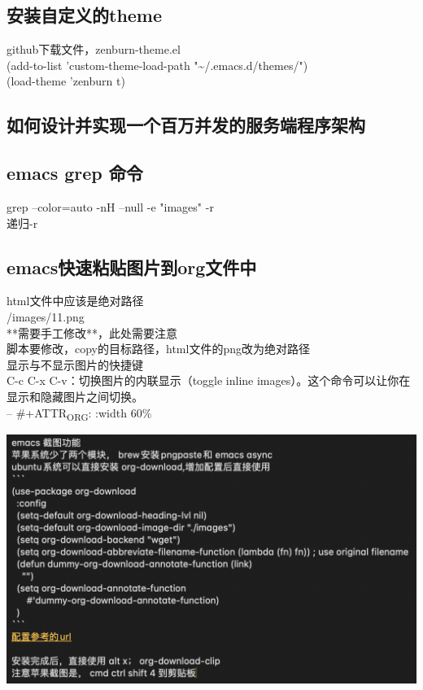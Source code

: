 \documentclass[11pt]{article}
\begin{document}
\subsection{安装自定义的theme}
\label{sec:org05050f6}
github下载文件，zenburn-theme.el\\

(add-to-list 'custom-theme-load-path "\textasciitilde{}/.emacs.d/themes/")\\
(load-theme 'zenburn t)\\

\subsection{如何设计并实现一个百万并发的服务端程序架构}
\label{sec:org22e539c}

\subsection{emacs grep 命令}
\label{sec:org0a04430}

grep --color=auto -nH --null -e "images" -r\\
递归-r\\

\subsection{emacs快速粘贴图片到org文件中}
\label{sec:org17254d1}

html文件中应该是绝对路径\\
/images/11.png\\
**需要手工修改**，此处需要注意\\

脚本要修改，copy的目标路径，html文件的png改为绝对路径\\

显示与不显示图片的快捷键\\
C-c C-x C-v：切换图片的内联显示（toggle inline images）。这个命令可以让你在显示和隐藏图片之间切换。\\

-- \#+ATTR\textsubscript{ORG}: :width 60\%\\
\begin{center}
\includegraphics[width=.9\linewidth]{emacs_magit,org-mod/2024-08-14_23-19-36_screenshot.png}
\end{center}
\end{document}
